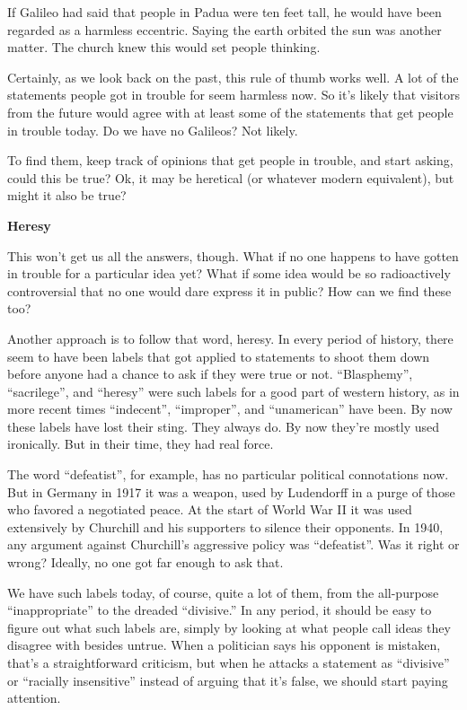 If Galileo had said that people in Padua were ten feet tall, he would
have been regarded as a harmless eccentric. Saying the earth orbited the
sun was another matter. The church knew this would set people thinking.

Certainly, as we look back on the past, this rule of thumb works well. A
lot of the statements people got in trouble for seem harmless now. So
it's likely that visitors from the future would agree with at least some
of the statements that get people in trouble today. Do we have no
Galileos? Not likely.

To find them, keep track of opinions that get people in trouble, and
start asking, could this be true? Ok, it may be heretical (or whatever
modern equivalent), but might it also be true?

\textbf{Heresy}

This won't get us all the answers, though. What if no one happens to
have gotten in trouble for a particular idea yet? What if some idea
would be so radioactively controversial that no one would dare express
it in public? How can we find these too?

Another approach is to follow that word, heresy. In every period of
history, there seem to have been labels that got applied to statements
to shoot them down before anyone had a chance to ask if they were true
or not. ``Blasphemy'', ``sacrilege'', and ``heresy'' were such labels
for a good part of western history, as in more recent times
``indecent'', ``improper'', and ``unamerican'' have been. By now these
labels have lost their sting. They always do. By now they're mostly used
ironically. But in their time, they had real force.

The word ``defeatist'', for example, has no particular political
connotations now. But in Germany in 1917 it was a weapon, used by
Ludendorff in a purge of those who favored a negotiated peace. At the
start of World War II it was used extensively by Churchill and his
supporters to silence their opponents. In 1940, any argument against
Churchill's aggressive policy was ``defeatist''. Was it right or wrong?
Ideally, no one got far enough to ask that.

We have such labels today, of course, quite a lot of them, from the
all-purpose ``inappropriate'' to the dreaded ``divisive.'' In any
period, it should be easy to figure out what such labels are, simply by
looking at what people call ideas they disagree with besides untrue.
When a politician says his opponent is mistaken, that's a
straightforward criticism, but when he attacks a statement as
``divisive'' or ``racially insensitive'' instead of arguing that it's
false, we should start paying attention.

